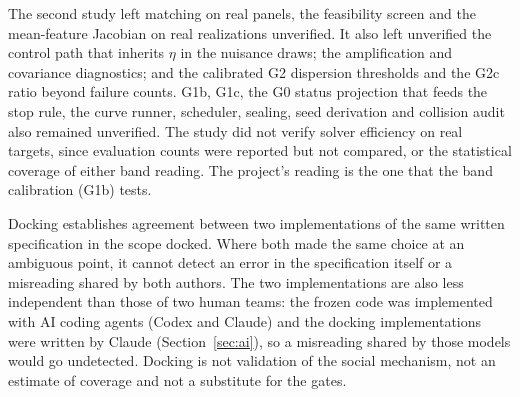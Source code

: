 The second study left matching on real panels, the feasibility screen and the mean-feature Jacobian on real realizations unverified. It also left unverified the control path that inherits $\eta$ in the nuisance draws; the amplification and covariance diagnostics; and the calibrated G2 dispersion thresholds and the G2c ratio beyond failure counts. G1b, G1c, the G0 status projection that feeds the stop rule, the curve runner, scheduler, sealing, seed derivation and collision audit also remained unverified. The study did not verify solver efficiency on real targets, since evaluation counts were reported but not compared, or the statistical coverage of either band reading. The project's reading is the one that the band calibration (G1b) tests.

Docking establishes agreement between two implementations of the same written specification in the scope docked. Where both made the same choice at an ambiguous point, it cannot detect an error in the specification itself or a misreading shared by both authors. The two implementations are also less independent than those of two human teams: the frozen code was implemented with AI coding agents (Codex and Claude) and the docking implementations were written by Claude (Section~\ref{sec:ai}), so a misreading shared by those models would go undetected. Docking is not validation of the social mechanism, not an estimate of coverage and not a substitute for the gates.
